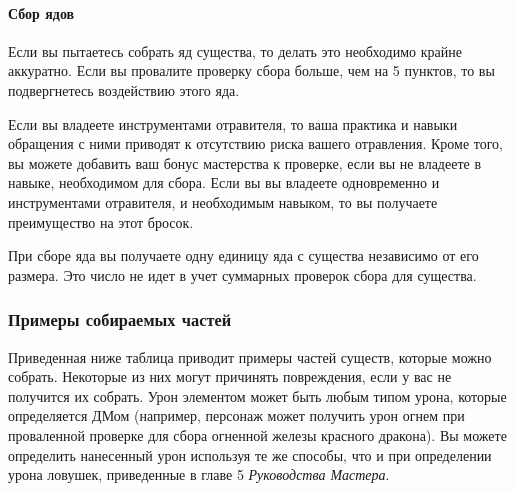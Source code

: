 \documentclass[a4paper, 9pt, twocolumn]{book}
\begin{document}
	\paragraph*{Сбор ядов}
	
	Если вы пытаетесь собрать яд существа, то делать это необходимо крайне аккуратно. Если вы провалите проверку сбора больше, чем на 5 пунктов, то вы подвергнетесь воздействию этого яда.
	
	Если вы владеете инструментами отравителя, то ваша практика и навыки обращения с ними приводят к отсутствию риска вашего отравления. Кроме того, вы можете добавить ваш бонус мастерства к проверке, если вы не владеете в навыке, необходимом для сбора. Если вы вы владеете одновременно и инструментами отравителя, и необходимым навыком, то вы получаете преимущество на этот бросок.
	
	При сборе яда вы получаете одну единицу яда с существа независимо от его размера. Это число не идет в учет суммарных проверок сбора для существа.
	
	\subsubsection{Примеры собираемых частей}
	
	Приведенная ниже таблица приводит примеры частей существ, которые можно собрать. Некоторые из них могут причинять повреждения, если у вас не получится их собрать. Урон элементом может быть любым типом урона, которые определяется ДМом (например, персонаж может получить урон огнем при проваленной проверке для сбора огненной железы красного дракона). Вы можете определить нанесенный урон используя те же способы, что и при определении урона ловушек, приведенные в главе 5 \textit{Руководства Мастера}.	
	
\end{document}
